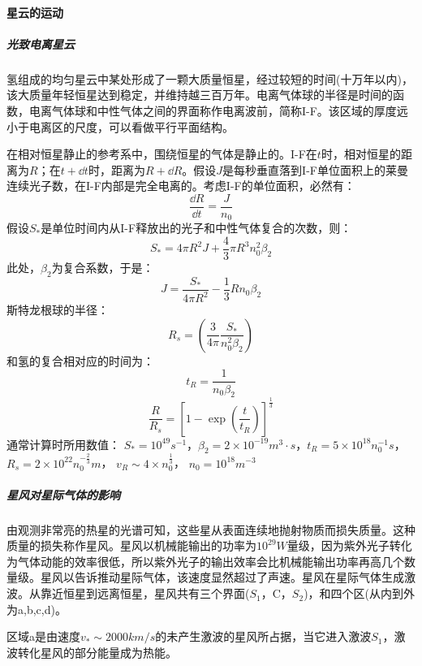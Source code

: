 \paragraph{星云的运动}
\subparagraph{光致电离星云}氢组成的均匀星云中某处形成了一颗大质量恒星，经过较短的时间(十万年以内)，该大质量年轻恒星达到稳定，并维持越三百万年。电离气体球的半径是时间的函数，电离气体球和中性气体之间的界面称作电离波前，简称I-F。该区域的厚度远小于电离区的尺度，可以看做平行平面结构。

在相对恒星静止的参考系中，围绕恒星的气体是静止的。I-F在$t$时，相对恒星的距离为$R$；在$t+\dd t$时，距离为$R+\dd R$。假设$J$是每秒垂直落到I-F单位面积上的莱曼连续光子数，在I-F内部是完全电离的。考虑I-F的单位面积，必然有：
\begin{equation}
	\frac{\dd R}{\dd t}=\frac{J}{n_{0}}
\end{equation}
假设$S_{*}$是单位时间内从I-F释放出的光子和中性气体复合的次数，则：
\begin{equation}
	S_{*}=4\pi R^2J+\frac{4}{3}\pi R^3n_{0}^2\beta_{2}
\end{equation}
此处，$\beta_{2}$为复合系数，于是：
\begin{equation}
	J=\frac{S_{*}}{4\pi R^2}-\frac{1}{3}Rn_{0}\beta_{2}
\end{equation}
斯特龙根球的半径：
\begin{equation}
	R_{s}=\left(\frac{3}{4\pi}\frac{S_{*}}{n_{0}^2\beta_{2}}\right)
\end{equation}
和氢的复合相对应的时间为：
\begin{equation}
	t_{R}=\frac{1}{n_{0}\beta_{2}}
\end{equation}
\begin{equation}
	\frac{R}{R_{s}}=\left[1-\exp(\frac{t}{t_{R}})\right]^{\frac{1}{3}}
\end{equation}
通常计算时所用数值：
$S_{*}=10^{49}s^{-1}$，$\beta_{2}=2\times 10^{-19}m^3\cdot s$，$t_{R}=5\times 10^{18}n_{0}^{-1}s$，$R_{s}=2\times 10^{22}n_{0}^{-\frac{2}{3}} m$，
$v_{R}\sim 4\times n_{0}^{\frac{1}{3}}$，
$n_{0}=10^{18}m^{-3}$
\subparagraph{星风对星际气体的影响}
由观测非常亮的热星的光谱可知，这些星从表面连续地抛射物质而损失质量。这种质量的损失称作星风。星风以机械能输出的功率为$10^{29}W$量级，因为紫外光子转化为气体动能的效率很低，所以紫外光子的输出效率会比机械能输出功率再高几个数量级。星风以告诉推动星际气体，该速度显然超过了声速。星风在星际气体生成激波。从靠近恒星到远离恒星，星风共有三个界面($S_{1}$，C，$S_{2}$)，和四个区(从内到外为a,b,c,d)。

区域a是由速度$v_{*}\sim2000km/s$的未产生激波的星风所占据，当它进入激波$S_{1}$，激波转化星风的部分能量成为热能。

